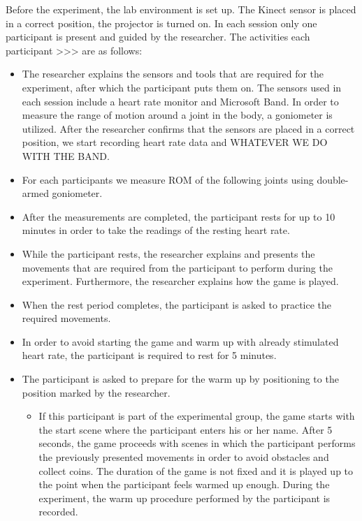 Before the experiment, the lab environment is set up. The Kinect sensor is placed in a correct position, the projector is turned on. In each session only one participant is present and guided by the researcher. The activities each participant >>> are as follows:
\begin{itemize}
\item The researcher explains the sensors and tools that are required for the experiment, after which the participant puts them on. The sensors used in each session include a heart rate monitor and Microsoft Band. In order to measure the range of motion around a joint in the body, a goniometer is utilized. %
After the researcher confirms that the sensors are placed in a correct position, we start recording heart rate data and WHATEVER WE DO WITH THE BAND.
\item For each participants we measure ROM of the following joints using double-armed goniometer. %
\item After the measurements are completed, the participant rests for up to 10 minutes in order to take the readings of the resting heart rate. 
\item While the participant rests, the researcher explains and presents the movements that are required from the participant to perform during the experiment. Furthermore, the researcher explains how the game is played.
\item When the rest period completes, the participant is asked to practice the required movements.
\item In order to avoid starting the game and warm up with already stimulated heart rate, the participant is required to rest for 5 minutes. 

\item The participant is asked to prepare for the warm up by positioning to the position marked by the researcher. 
\begin{itemize}
\item  If this participant is part of the experimental group, the game starts with the start scene where the participant enters his or her name. After 5 seconds, the game proceeds with scenes in which the participant performs the previously presented movements in order to avoid obstacles and collect coins. The duration of the game is not fixed and it is played up to the point when the participant feels warmed up enough. During the experiment, the warm up procedure performed by the participant is recorded. %


\end{itemize}
\end{itemize}
